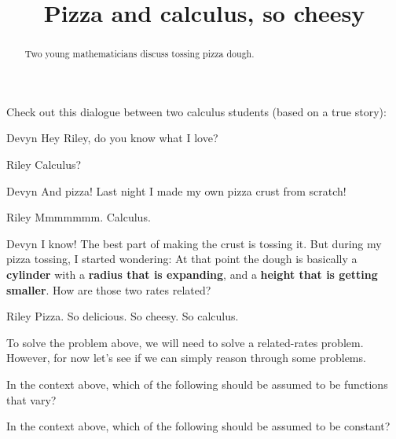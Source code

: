 \documentclass{ximera}
\title[Break-Ground:]{Pizza and calculus, so cheesy}
\begin{document}
\begin{abstract}
Two young mathematicians discuss tossing pizza dough. 
\end{abstract}
\maketitle

Check out this dialogue between two calculus students (based on a true
story):


\begin{dialogue}
\item[Devyn] Hey Riley, do you know what I love?
\item[Riley] Calculus? 
\item[Devyn] And pizza! Last night I made my own pizza crust from
  scratch!
\item[Riley] Mmmmmmm. Calculus. 
\item[Devyn] I know! The best part of making the crust is tossing it.
  But during my pizza tossing, I started wondering: At that point the
  dough is basically a \textbf{cylinder} with a \textbf{radius that is
    expanding}, and a \textbf{height that is getting smaller}. How are
  those two rates related?
\item[Riley] Pizza. So delicious. So cheesy. So calculus.
\end{dialogue}

To solve the problem above, we will need to solve a related-rates
problem. However, for now let's see if we can simply reason through
some problems.


\begin{problem}
  In the context above, which of the following should be assumed to be
  functions that vary?
  \begin{selectAll}
  \end{selectAll}
\end{problem}

\begin{problem}
  In the context above, which of the following should be assumed to be
  constant?
  \begin{selectAll}
  \end{selectAll}
\end{problem}



\end{document}
